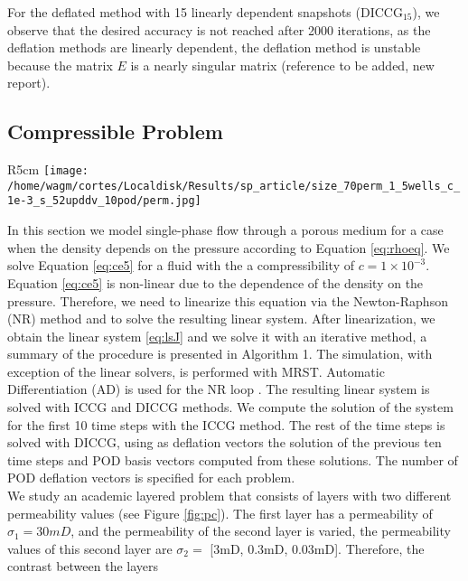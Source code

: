 \documentclass[12pt]{article}
\numberwithin{equation}{section}
\begin{document}
For the deflated method with 15 linearly dependent snapshots (DICCG$_{15}$), we observe that the desired accuracy is not reached after 2000 iterations, as the deflation methods are linearly dependent, the deflation method is unstable because the matrix $E$ is a nearly singular matrix (reference to be added, new report).


\subsection{Compressible Problem}

\begin{wrapfigure}{R}{5cm}
\centering 
\vspace{-20pt}
\texttt{[image: /home/wagm/cortes/Localdisk/Results/sp\_article/size\_70perm\_1\_5wells\_c\_1e-3\_s\_52upddv\_10pod/perm.jpg]}
 \vspace{-15pt}
\caption{ Heterogeneous permeability, 5 wells, compressible problem.}\label{fig:pc}
\vspace{-10pt}
\end{wrapfigure} 
In this section we model single-phase flow through a porous medium for a case when the density depends on the pressure 
according to Equation \eqref{eq:rhoeq}. We solve Equation \eqref{eq:ce5} for a fluid with the a compressibility of $c= 1 \times 10^{-3}$.
Equation \eqref{eq:ce5} is non-linear due to the dependence of the density on the pressure. Therefore, we need to 
linearize this equation via the Newton-Raphson (NR) method and to solve the resulting linear system. After linearization, we obtain the linear system \eqref{eq:lsJ} and we solve it with an iterative method, a summary of the procedure is presented in Algorithm 1. The simulation, with exception of the linear solvers, is performed with MRST. Automatic Differentiation (AD) is used for the NR loop \cite{Lie13}. The resulting linear system is solved with ICCG and DICCG methods. We compute the solution of the system for the first 10 time steps with the ICCG method. The rest of the time steps is solved with DICCG, using as deflation vectors the solution of the previous ten time steps and POD basis vectors computed from these solutions. The number of POD deflation vectors is specified for each problem. \\
We study an academic layered problem that consists of layers with two different permeability values 
(see Figure \ref{fig:pc}). The first layer has a permeability of $\sigma_1 = 30mD$, and the permeability 
of the second layer is varied, the permeability values of this second layer are $\sigma_2 =$ [3mD, 0.3mD, 0.03mD]. Therefore, the contrast between the layers 
\end{document}
